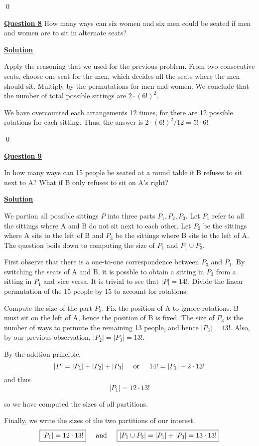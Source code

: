 \documentclass{article}
\newcommand{\new}[1]{
    \vspace{2mm}
    \noindent
    \textbf{
    \underline{#1}}
}
\newcommand{\textOr}{
    {
        \hspace{5mm}
        \textrm{or}
        \hspace{5mm}
    }
}
\newcommand{\textAnd}{
    {
        \hspace{5mm}
        \textrm{and}
        \hspace{5mm}
    }
}
\newcommand{\m}{
    \cdot
}
\begin{document}
\hfill \qed

\new{Question 8} How many ways can six women and six men could 
be seated if men and women are to sit in alternate seats?

\new{Solution} 
Apply the reasoning that we used for the previous problem. 
From two consecutive seats, choose one seat for the men, which 
decides all the seats where the men should sit. Multiply by the 
permutations for men and women. We conclude that the number of 
total possible sittings are $2\m (6!)^2$. 

\color{red}
We have overcounted each arrangements 12 times, for there are 12 possible rotations for each sitting. 
Thus, the answer is $\boxed{2\m (6!)^2/12 = 5!\m6!}$
\color{black}

\hfill \qed

\new{Question 9} 
In how many ways can 15 people be seated at a round table 
if B refuses to sit next to A? What if B only refuses to sit 
on A's right?

\new{Solution} 
We partion all possible sittings $P$ into three parts $P_1, P_2, P_3$. 
Let $P_1$ refer to all the sittings where A and B do 
not sit next to each other. Let $P_2$ be the sittings 
where A sits to the left of B and $P_3$ be the sittings 
where B sits to the left of A. The question boils down 
to computing the size of $P_1$ and $P_1 \cup P_3$. 

First observe that there is a one-to-one correspondence 
between $P_3$ and $P_1$. By switching the seats of A and 
B, it is possble to obtain a sitting in $P_3$ from a sitting 
in $P_1$ and vice versa. It is trivial to see that $|P| = 14!$. Divide the linear 
permutation of the 15 people by 15 to account for rotations. 

Compute the size of the part $P_3$. Fix the position of A
to ignore rotations. 
B must sit on the left of A, hence the position of B is fixed. 
The size of $P_3$ is the number of ways to permute the remaining 
13 people, and hence $|P_3| = 13!$. Also, by our previous observation, 
$|P_2| = |P_3| = 13!$. 

By the addtion principle, 
\[
    |P| = |P_1| + |P_2| + |P_3| \textOr 
    14! = |P_1| + 2\m 13!
\]
and thus 
\color{red}
\[
    |P_1| = 12\m13!
\]
\color{black}

so we have computed the sizes of all partitions. 

Finally, we write the sizes of the two partitions of our interest.
\color{red} 
\[
    \boxed{
    |P_1| = 12\m 13!
    }
    \textAnd
    \boxed{
    |P_1 \cup P_3| = |P_1| + |P_3| = 13\m 13!
    }
\]
\color{black}
\end{document}
